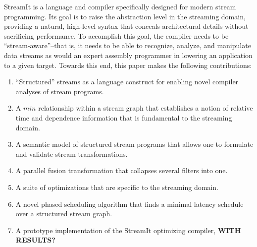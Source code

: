 StreamIt is a language and compiler specifically designed for modern
stream programming.  Its goal is to raise the abstraction level in the
streaming domain, providing a natural, high-level syntax that conceals
architectural details without sacrificing performance.  To accomplish
this goal, the compiler needs to be ``stream-aware''--that is, it
needs to be able to recognize, analyze, and manipulate data streams as
would an expert assembly programmer in lowering an application to a
given target.  Towards this end, this paper makes the following
contributions:
\begin{enumerate}

\item ``Structured'' streams as a language construct for enabling
  novel compiler analyses of stream programs.
  
\item A $min$ relationship within a stream graph that establishes a
  notion of relative time and dependence information that is
  fundamental to the streaming domain.

\item A semantic model of structured stream programs that allows one
  to formulate and validate stream transformations.

\item A parallel fusion transformation that collapses several filters
  into one.

\item A suite of optimizations that are specific to the streaming
  domain.

\item A novel phased scheduling algorithm that finds a minimal latency
schedule over a structured stream graph.

\item A prototype implementation of the StreamIt optimizing compiler,
  {\bf WITH RESULTS?}

\end{enumerate}


